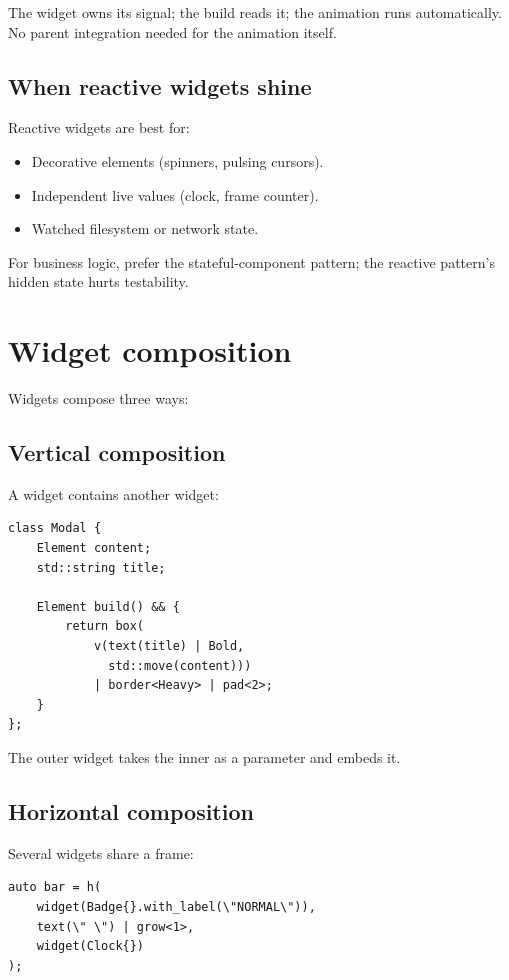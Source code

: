 The widget owns its signal; the build reads it; the animation
runs automatically. No parent integration needed for the
animation itself.

\subsection*{When reactive widgets shine}

Reactive widgets are best for:

\begin{itemize}[leftmargin=*]
  \item Decorative elements (spinners, pulsing cursors).
  \item Independent live values (clock, frame counter).
  \item Watched filesystem or network state.
\end{itemize}

For business logic, prefer the stateful-component pattern; the
reactive pattern's hidden state hurts testability.

\section{Widget composition}

Widgets compose three ways:

\subsection*{Vertical composition}

A widget contains another widget:

\begin{lstlisting}
class Modal {
    Element content;
    std::string title;

    Element build() && {
        return box(
            v(text(title) | Bold,
              std::move(content)))
            | border<Heavy> | pad<2>;
    }
};
\end{lstlisting}

The outer widget takes the inner as a parameter and embeds it.

\subsection*{Horizontal composition}

Several widgets share a frame:

\begin{lstlisting}
auto bar = h(
    widget(Badge{}.with_label(\"NORMAL\")),
    text(\" \") | grow<1>,
    widget(Clock{})
);
\end{lstlisting}

